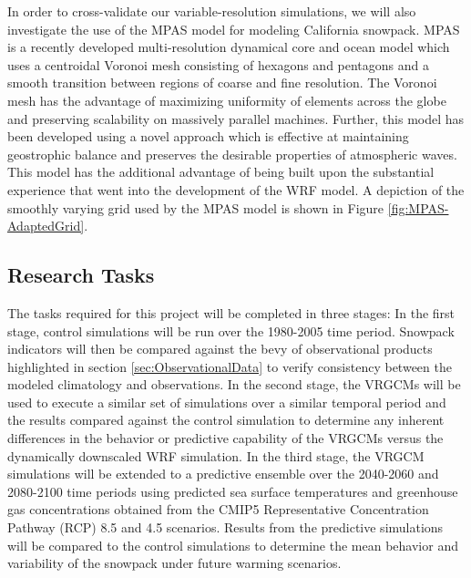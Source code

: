 \documentclass[11pt]{article}
\begin{document}
In order to cross-validate our variable-resolution simulations, we will also investigate the use of the MPAS model \citep{skamarock2012mpas} for modeling California snowpack.  MPAS is a recently developed multi-resolution dynamical core and ocean model which uses a centroidal Voronoi mesh consisting of hexagons and pentagons and a smooth transition between regions of coarse and fine resolution.  The Voronoi mesh has the advantage of maximizing uniformity of elements across the globe and preserving scalability on massively parallel machines.  Further, this model has been developed using a novel approach \citep{JTTDRWCSJBK2009JCP} which is effective at maintaining geostrophic balance and preserves the desirable properties of atmospheric waves.  This model has the additional advantage of being built upon the substantial experience that went into the development of the WRF model.  A depiction of the smoothly varying grid used by the MPAS model is shown in Figure \ref{fig:MPAS-AdaptedGrid}.

\subsection{Research Tasks}


The tasks required for this project will be completed in three stages: In the first stage, control simulations will be run over the 1980-2005 time period. Snowpack indicators will then be compared against the bevy of observational products highlighted in section \ref{sec:ObservationalData} to verify consistency between the modeled climatology and observations. In the second stage, the VRGCMs will be used to execute a similar set of simulations over a similar temporal period and the results compared against the control simulation to determine any inherent differences in the behavior or predictive capability of the VRGCMs versus the dynamically downscaled WRF simulation. In the third stage, the VRGCM simulations will be extended to a predictive ensemble over the 2040-2060 and 2080-2100 time periods using predicted sea surface temperatures and greenhouse gas concentrations obtained from the CMIP5 Representative Concentration Pathway (RCP) 8.5 and 4.5 scenarios. Results from the predictive simulations will be compared to the control simulations to determine the mean behavior and variability of the snowpack under future warming scenarios.
\end{document}
